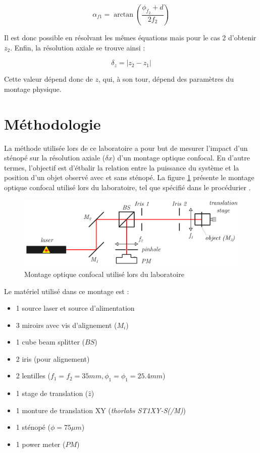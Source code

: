 \documentclass[11pt,letterpaper]{article}
\begin{document}
\begin{equation}
  \alpha_{f1}= \arctan\left( \frac{\phi_{f_{2}}+d}{2f_{2}} \right)
\end{equation}

Il est donc possible en résolvant les mêmes équations mais pour le cas 2 d'obtenir $z_{2}$. Enfin,
la résolution axiale se trouve ainsi :

\begin{equation}
  \delta_{z}= |z_{2}-z_{1}|
\end{equation}

Cette valeur dépend donc de $z$, qui, à son tour, dépend des paramètres du montage physique.

\section{Méthodologie}
La méthode utilisée lors de ce laboratoire a pour but de mesurer l'impact d'un sténopé sur la 
résolution axiale ($\delta x$) d'un montage optique confocal. En d'autre termes, l'objectif est 
d'étbalir la relation entre la puissance du système et la position d'un objet observé avec et sans 
sténopé. La figure \ref{montage} présente le montage optique confocal utilisé lors du laboratoire, tel que spécifié dans le procédurier \cite{sheehy_experience_2024}. 

\begin{figure}[H]
  \centering
  \includegraphics[scale=0.2]{montage_labo.png}
  \caption{Montage optique confocal utilisé lors du laboratoire}
  \label{montage}
\end{figure}

Le matériel utilisé dans ce montage est :

\begin{itemize}
    \item 1 source laser et source d’alimentation
    \item 3 miroirs avec vis d’alignement ($M_i$)
    \item 1 cube beam splitter ($BS$)
    \item 2 iris (pour alignement)
    \item 2 lentilles ($f_1 = f_2 = 35 mm, \phi_1 = \phi_1 = 25.4 mm$)
    \item 1 stage de translation ($\hat{z}$)
    \item 1 monture de translation XY (\textit{thorlabs ST1XY-S(/M)})
    \item 1 sténopé ($\phi = 75\mu m$)
    \item 1 power meter ($PM$)
\end{itemize}
\end{document}
